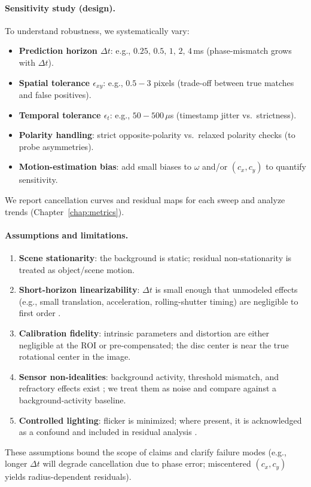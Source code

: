 \paragraph{Sensitivity study (design).}
To understand robustness, we systematically vary:
\begin{itemize}
    \item \textbf{Prediction horizon $\Delta t$}: e.g., $0.25,\,0.5,\,1,\,2,\,4$\,ms (phase-mismatch grows with $\Delta t$).
    \item \textbf{Spatial tolerance $\epsilon_{xy}$}: e.g., $0.5\!-\!3$ pixels (trade-off between true matches and false positives).
    \item \textbf{Temporal tolerance $\epsilon_t$}: e.g., $50\!-\!500\,\mu$s (timestamp jitter vs.\ strictness).
    \item \textbf{Polarity handling}: strict opposite-polarity vs.\ relaxed polarity checks (to probe asymmetries).
    \item \textbf{Motion-estimation bias}: add small biases to $\omega$ and/or $(c_x,c_y)$ to quantify sensitivity.
\end{itemize}
We report cancellation curves and residual maps for each sweep and analyze trends (Chapter~\ref{chap:metrics}).

\paragraph{Assumptions and limitations.}
\begin{enumerate}
    \item \textbf{Scene stationarity}: the background is static; residual non-stationarity is treated as object/scene motion.
    \item \textbf{Short-horizon linearizability}: $\Delta t$ is small enough that unmodeled effects (e.g., small translation, acceleration, rolling-shutter timing) are negligible to first order \cite{Gallego2017Angular}.
    \item \textbf{Calibration fidelity}: intrinsic parameters and distortion are either negligible at the ROI or pre-compensated; the disc center is near the true rotational center in the image.
    \item \textbf{Sensor non-idealities}: background activity, threshold mismatch, and refractory effects exist \cite{Brandli2014DAVIS,Delbruck2020Handbook}; we treat them as noise and compare against a background-activity baseline.
    \item \textbf{Controlled lighting}: flicker is minimized; where present, it is acknowledged as a confound and included in residual analysis \cite{Gallego2020Survey}.
\end{enumerate}
These assumptions bound the scope of claims and clarify failure modes (e.g., longer $\Delta t$ will degrade cancellation due to phase error; miscentered $(c_x,c_y)$ yields radius-dependent residuals).
\vspace{0.5em}

